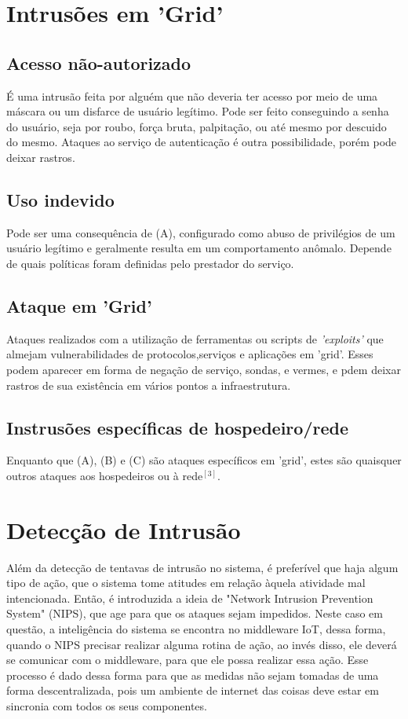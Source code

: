\documentclass[journal]{IEEEtran}
\begin{document}
\section{Intrusões em 'Grid'}
\subsection{Acesso não-autorizado}
É uma intrusão feita por alguém que não deveria ter acesso por meio de uma máscara ou um disfarce de usuário legítimo. Pode ser feito conseguindo a senha do usuário, seja por roubo, força bruta, palpitação, ou até mesmo por descuido do mesmo. Ataques ao serviço de autenticação é outra possibilidade, porém pode deixar rastros.
\subsection{Uso indevido}
Pode ser uma consequência de (A), configurado como abuso de privilégios de um usuário legítimo e geralmente resulta em um comportamento anômalo. Depende de quais políticas foram definidas pelo prestador do serviço.
\subsection{Ataque em 'Grid'}
Ataques realizados com a utilização de ferramentas ou scripts de \textit{'exploits'} que almejam vulnerabilidades de protocolos,serviços e aplicações em 'grid'. Esses podem aparecer em forma de negação de serviço, sondas, e vermes, e pdem deixar rastros de sua existência em vários pontos a infraestrutura.
\subsection{Instrusões específicas de hospedeiro/rede}
Enquanto que (A), (B) e (C) são ataques específicos em 'grid', estes são quaisquer outros ataques aos hospedeiros ou à rede$^{ [3] }$.

\section{Detecção de Intrusão}
Além da detecção de tentavas de intrusão no sistema, é preferível que haja algum tipo de ação, que o sistema tome atitudes em relação àquela atividade mal intencionada. Então, é introduzida a ideia de "Network Intrusion Prevention System" (NIPS), que age para que os ataques sejam impedidos. Neste caso em questão, a inteligência do sistema se encontra no middleware IoT, dessa forma, quando o NIPS precisar realizar alguma rotina de ação, ao invés disso, ele deverá se comunicar com o middleware, para que ele possa realizar essa ação. Esse processo é dado dessa forma para que as medidas não sejam tomadas de uma forma descentralizada, pois um ambiente de internet das coisas deve estar em sincronia com todos os seus componentes. \par
\end{document}
